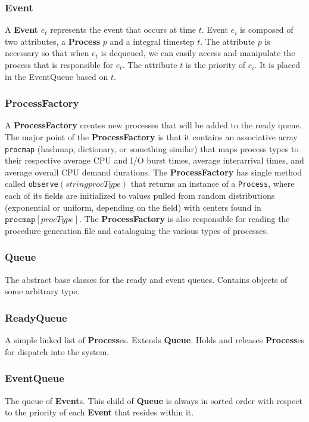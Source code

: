 \documentclass{article}
\begin{document}
\subsubsection*{Event}
A \textbf{Event} $e_{t}$ represents the event that occurs at time $t$.
Event $e_{i}$ is composed of two attributes, a \textbf{Process} $p$ and a integral timestep $t$. 
The attribute $p$ is necessary so that when $e_{t}$ is dequeued, we can easily access and manipulate the process that is responsible for $e_{t}$.
The attribute $t$ is the priority of $e_{i}$. It is placed in the EventQueue based on $t$.
\subsubsection*{ProcessFactory}
A \textbf{ProcessFactory} creates new processes that will be added to the ready queue. The major point of the \textbf{ProcessFactory} is that it
contains an associative array \texttt{procmap} (hashmap, dictionary, or something similar) that maps process types to their respective average 
CPU and I/O burst times, average interarrival times, and average overall CPU demand durations. The \textbf{ProcessFactory} has single method
called \texttt{observe}$(string procType)$ that returns an instance of a \texttt{Process}, where each of its fields are initialized to values
pulled from random distributions (exponential or uniform, depending on the field) with centers found in $\texttt{procmap}[procType]$. The 
\textbf{ProcessFactory} is also responsible for reading the procedure generation file and cataloguing the various types of processes.

\subsubsection*{Queue}
The abstract base classes for the ready and event queues. Contains objects of some arbitrary type. 
\subsubsection*{ReadyQueue}
A simple linked list of \textbf{Process}es. Extends \textbf{Queue}. Holds and releases \textbf{Process}es for dispatch into the system.
\subsubsection*{EventQueue}
The queue of \textbf{Event}s. This child of \textbf{Queue} is always in sorted order with respect to the priority of each \textbf{Event} that
resides within it.
\end{document}
